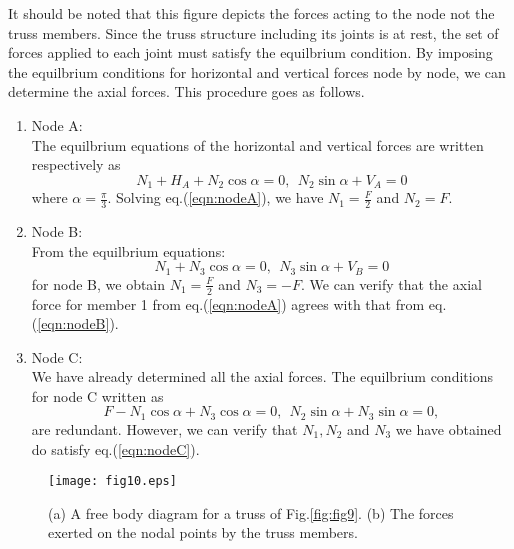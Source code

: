 \documentclass[10pt,a4j]{article}
\begin{document}
It should be noted that this figure depicts the forces acting to the node not the truss members.  
Since the truss structure including its joints is at rest, the set of forces 
applied to each joint must satisfy the equilbrium condition.
By imposing the equilbrium conditions for horizontal and vertical forces node by node, 
we can determine the axial forces. This procedure goes as follows.
\begin{enumerate}
\item
	Node A: \\
		The equilbrium equations of 
	the horizontal and vertical forces are written respectively as 
	\begin{equation}
		N_1+H_A+N_2\cos\alpha=0, \ \ N_2\sin\alpha+V_A=0
		\label{eqn:nodeA}
	\end{equation}
	where $\alpha=\frac{\pi}{3}$. Solving eq.(\ref{eqn:nodeA}), 
	we have $N_1=\frac{F}{2}$ and $N_2=F$. 
\item
	Node B: \\
	From the equilbrium equations:
	\begin{equation}
		N_1+N_3\cos\alpha=0, \ \ N_3\sin\alpha+V_B=0	
		\label{eqn:nodeB}
	\end{equation}
	for node B, we obtain $N_1=\frac{F}{2}$ and $N_3=-F$.
	We can verify that the axial force for member 1 from eq.(\ref{eqn:nodeA}) 
	agrees with that from eq.(\ref{eqn:nodeB}).
\item
	Node C: \\
	We have already determined all the axial forces. The equilbrium 
	conditions for node C written as 
	\begin{equation}
		F-N_1\cos\alpha+N_3\cos\alpha=0, \ \ N_2\sin\alpha+N_3\sin\alpha=0,
		\label{eqn:nodeC}
	\end{equation}
	are redundant. However, we can verify that $N_1,N_2$ and $N_3$ we 
	have obtained do satisfy eq.(\ref{eqn:nodeC}). 
\end{enumerate}
\begin{figure}[h]
	\begin{center}
	\texttt{[image: fig10.eps]} 
	\end{center}
	\caption{(a) A free body diagram for a truss of Fig.\ref{fig:fig9}. 
	(b) The forces exerted on the nodal points by the truss members.} 
	\label{fig:fig10}
\end{figure}
\end{document}
